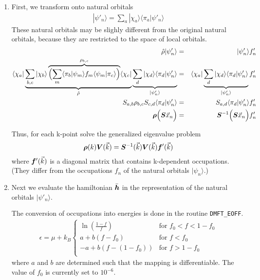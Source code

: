 \documentclass[11pt,a4paper]{report}
\begin{document}
\begin{enumerate}
  \item First, we transform onto natural orbitals 
     \begin{eqnarray}
        |\psi'_n\rangle=\sum_a|\chi_a\rangle \langle\pi_a|\psi'_n\rangle
     \end{eqnarray}
     These natural orbitals may be slighly different from the original
     natural orbitals, because they are restricted to the space of
     local orbitals.
     \begin{eqnarray}
        \hat{\rho}|\psi'_n\rangle&=&|\psi'_n\rangle f'_n
        \nonumber\\
        \langle\chi_a|
        \underbrace{\sum_{b,c}|\chi_b\rangle
        \overbrace{
           \Bigl(\sum_m\langle\pi_b|\psi_m\rangle f_m
                 \langle\psi_m|\pi_c\rangle\Bigr)}^{\rho_{b,c}}
               \langle\chi_c|}_{\hat{\rho}}
             \underbrace{\sum_d|\chi_d\rangle\langle\pi_d|\psi'_n\rangle
              }_{|\psi'_n\rangle}
             &=&
             \langle\chi_a|
             \underbrace{\sum_d|\chi_d\rangle\langle\pi_d|\psi'_n\rangle
              }_{|\psi'_n\rangle} f'_n
     \nonumber\\
           S_{a,b}\rho_{b,c}S_{c,d}\langle\pi_d|\psi'_n\rangle
           &=&S_{a,d}\langle\pi_d|\psi'_n\rangle f'_n
     \nonumber\\
           \bm{\rho} \Bigl(\bm{S} \vec{x}_n\Bigr)
           &=&\bm{S}^{-1}\Bigl(\bm{S} \vec{x}_n\Bigr) f'_n
     \end{eqnarray}

     Thus, for each k-point solve the generalized eigenvalue problem
     \begin{eqnarray*}
        \bm{\rho}(k)\bm{V}(\vec{k})=
        \bm{S}^{-1}(\vec{k})\bm{V}(\vec{k})\bm{f}'(\vec{k})
     \end{eqnarray*}
     where $\bm{f}'(\vec{k})$ is a diagonal matrix that contains
     k-dependent occupations. (They differ from the occupations $f_n$
     of the natural orbitals $|\psi_n\rangle$.)
%
\item Next we evaluate the hamiltonian $\bar{\bm{h}}$ in the
  representation of the natural orbitals $|\psi'_n\rangle$.

  The conversion of occupations into energies is done in the routine
  \verb|DMFT_EOFF|.
  \begin{eqnarray}
  \epsilon=\mu+k_B
  \begin{cases}
  \ln\left(\frac{1-f}{f}\right) &\text{for $f_0<f<1-f_0$}\\
  a+b(f-f_0)&\text{for $f<f_0$}\\
  -a+b(f-(1-f_0))&\text{for $f>1-f_0$}\\
  \end{cases}
  \end{eqnarray}
  where $a$ and $b$ are determined such that the mapping is
  differentiable. The value of $f_0$ is currently set to $10^{-6}$.


\end{enumerate}
\end{document}

